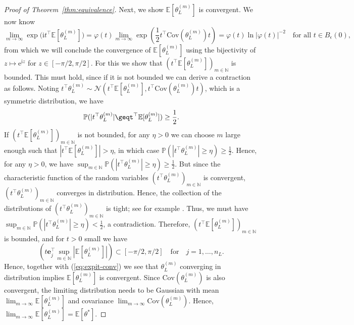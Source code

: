 \documentclass[11pt,english]{article}
\theoremstyle{plain}
\theoremstyle{plain}
\theoremstyle{plain}
\theoremstyle{plain}
\numberwithin{equation}{section}
\begin{document}
\begin{proof}[Proof of Theorem~\ref{thm:equivalence}]
		Next, we show $\mathbb{E}[\theta_{L}^{(m)}]$ is convergent. We now
		know
		\begin{equation}
			\lim_{m\to\infty}\exp\bigl(\mathrm{i}t^{\top}\mathbb{E}[\theta_{L}^{(m)}]\bigr)=\varphi(t)\lim_{m\to\infty}\exp\left(\frac{1}{2}t^{\top}\mathrm{Cov}(\theta_{L}^{(m)})t\right)=\varphi(t)\ln|\varphi(t)|^{-2}\quad\text{for all }t\in B_{\epsilon}(0),\label{eq:expit-conv}
		\end{equation}
		from which we will conclude the convergence of $\mathbb{E}[\theta_{L}^{(m)}]$
		using the bijectivity of $z\mapsto\mathrm{e}^{\mathrm{i}z}$ for $z\in[-\pi/2,\pi/2]$.
		For this we show that $(t^{\top}\mathbb{E}[\theta_{L}^{(m)}])_{m\in\mathbb{N}}$
		is bounded. This must hold, since if it is not bounded we can derive
		a contraction as follows. Noting $t^{\top}\theta_{L}^{(m)}\sim\mathcal{N}(t^{\top}\mathbb{E}[\theta_{L}^{(m)}],t^{\top}\mathrm{Cov}(\theta_{L}^{(m)})t)$,
		which is a symmetric distribution, we have
		\[
			\mathbb{P}(|t^{\top}\theta_{L}^{(m)}|\geqt^{\top}\mathbb{E}[\theta_{L}^{(m)}])\geq\frac{1}{2}.
		\]
		If $(t^{\top}\mathbb{E}[\theta_{L}^{(m)}])_{m\in\mathbb{N}}$
		is not bounded, for any $\eta>0$ we can choose $m$ large enough
		such that $|t^{\top}\mathbb{E}[\theta_{L}^{(m)}]|>\eta$,
		in which case $\mathbb{P}(|t^{\top}\theta_{L}^{(m)}|\geq\eta)\geq\frac{1}{2}.$
		Hence, for any $\eta>0$, we have $\sup_{m\in\mathbb{N}}\mathbb{P}(|t^{\top}\theta_{L}^{(m)}|\geq\eta)\geq\frac{1}{2}$.
		But since the characteristic function of the random variables $(t^{\top}\theta_{L}^{(m)})_{m\in\mathbb{N}}$
		is convergent, $(t^{\top}\theta_{L}^{(m)})_{m\in\mathbb{N}}$
		converges in distribution. Hence, the collection of the distributions
		of $(t^{\top}\theta_{L}^{(m)})_{m\in\mathbb{N}}$ is tight;
		see for example \cite[Theorem 5.2]{Billingsley.P_1999_ConvergenceProbabilityMeasures}.
		Thus, we must have $\sup_{m\in\mathbb{N}}\mathbb{P}(|t^{\top}\theta_{L}^{(m)}|\geq\eta)<\frac{1}{2}$,
		a contradiction. Therefore, $(t^{\top}\mathbb{E}[\theta_{L}^{(m)}])_{m\in\mathbb{N}}$
		is bounded, and for $t>0$ small we have
		\[
			(t\boldsymbol{e}_{j}^{\top}\sup_{m\in\mathbb{N}}|\mathbb{E}[\theta_{L}^{(m)}]|)\subset[-\pi/2,\pi/2]\quad\text{for}\quad j=1,\dots,n_{L}.
		\]
		Hence, together with (\ref{eq:expit-conv}) we see that $\theta_{L}^{(m)}$
		converging in distribution implies $\mathbb{E}[\theta_{L}^{(m)}]$
		is convergent. Since $\mathrm{Cov}(\theta_{L}^{(m)})$ is also convergent,
		the limiting distribution needs to be Gaussian with mean $\lim_{m\to\infty}\mathbb{E}[\theta_{L}^{(m)}]$
		and covariance $\lim_{m\to\infty}\mathrm{Cov}(\theta_{L}^{(m)})$.
		Hence, $\lim_{m\to\infty}\mathbb{E}[\theta_{L}^{(m)}]=\mathbb{E}[\theta^{*}]$.
	\fi
\end{proof}
\end{document}
